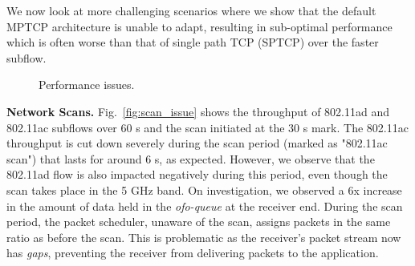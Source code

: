 We now look at more challenging scenarios where we show that the 
default MPTCP architecture is unable to adapt, resulting in sub-optimal 
performance which is often worse than that of single path TCP (SPTCP) over the
faster subflow.

\begin{figure*}[ht]
    \centering
    \hfill
    \hfill
    \vspace{-0.15in}
    \caption{Performance issues.}
\end{figure*}
\fi

\noindent\textbf{Network Scans. }Fig.~\ref{fig:scan_issue} shows the throughput of 802.11ad
and 802.11ac subflows over 60 s and the scan initiated at the 30 s mark. The 802.11ac throughput 
is cut down severely during the scan period (marked as "802.11ac scan") that lasts for 
around 6 s, as expected.
However, we observe that the 802.11ad flow is also impacted negatively during this period, even though the scan takes place in the 
5 GHz band. On investigation, we observed a 6x increase in the amount of data held in 
the \emph{ofo-queue} at the receiver end. During the scan period, the packet
scheduler, unaware of the scan, assigns packets in the same ratio as before the scan. This is 
problematic as the receiver's packet stream now has \textit{gaps}, 
preventing the receiver from delivering packets to the application. 

